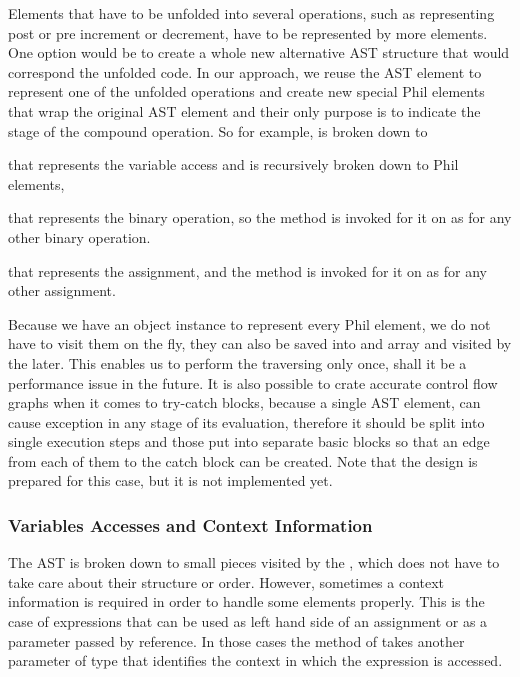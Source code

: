        Elements that have to be unfolded into several operations, 
        such as  representing post or pre increment 
        or decrement, have to be represented by more elements. 
        One option would be to create a whole new alternative 
        AST structure that would correspond the unfolded code. 
        In our approach, we reuse the AST element to represent one 
        of the unfolded operations and create new special Phil 
        elements that wrap the original AST element and their 
        only purpose is to indicate the stage of the compound 
        operation. So for example,  is broken down 
        to 
        \begin{itemize*}
            \item {} that represents the variable access and 
                is recursively broken down to Phil elements, 
            \item {} that represents the binary operation, 
                so the  method is invoked for it on  as 
                for any other binary operation.
            \item {} that represents the assignment, 
                and the  method is invoked for it on  as 
                for any other assignment.
        \end{itemize*}
        
        Because we have an object instance to represent every Phil element, 
        we do not have to visit them on the fly, they can also be saved into 
        and array and visited by the  later. This enables 
        us to perform the traversing only once, shall it be a performance issue 
        in the future. It is also possible to crate accurate control flow 
        graphs when it comes to try-catch blocks, because a single AST element, 
        can cause exception in any stage of its evaluation, therefore it should 
        be split into single execution steps and those put into separate 
        basic blocks so that an edge from each of them to the 
        catch block can be created. Note that the design is prepared 
        for this case, but it is not implemented yet.
        
        \subsubsection*{Variables Accesses and Context Information}
        The AST is broken down to small pieces visited by the , 
        which does not have to take care about their structure or order. However, 
        sometimes a context information is required in order to handle 
        some elements properly. This is the case of expressions that can be 
        used as left hand side of an assignment or as a parameter passed 
        by reference. In those cases the  method of  
        takes another parameter of type  that identifies the 
        context in which the expression is accessed.
        
